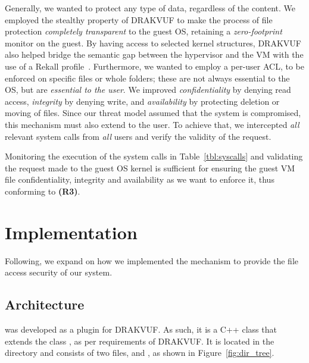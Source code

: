 \par Generally, we wanted to protect any type of data, regardless of the content. We employed the stealthy property of DRAKVUF to make the process of file protection \emph{completely transparent} to the guest \ac{OS}, retaining a \emph{zero-footprint} monitor on the guest. By having access to selected kernel structures, DRAKVUF also helped bridge the semantic gap between the hypervisor and the \ac{VM} with the use of a Rekall profile~\cite{rekall}. Furthermore, we wanted to employ a per-user \ac{ACL}, to be enforced on specific files or whole folders; these are not always essential to the \ac{OS}, but are \emph{essential to the user}. We improved \emph{confidentiality} by denying read access, \emph{integrity} by denying write, and \emph{availability} by protecting deletion or moving of files. Since our threat model assumed that the system is compromised, this mechanism must also extend to the  user. To achieve that, we intercepted \emph{all} relevant system calls from \emph{all} users and verify the validity of the request. 

\par Monitoring the execution of the system calls in Table~\ref{tbl:syscalls} and validating the request made to the guest \ac{OS} kernel is sufficient for ensuring the guest \ac{VM} file confidentiality, integrity and availability as we want to enforce it, thus conforming to \textbf{(R3)}.


\section{Implementation}\label{sec:implementation}

\par Following, we expand on how we implemented the mechanism to provide the file access security of our system.

\subsection{Architecture}\label{sub:arch}

\par {} was developed as a plugin for DRAKVUF. As such, it is a C++ class that extends the class , as per requirements of DRAKVUF. It is located in the directory  and consists of two files,  and , as shown in Figure~\ref{fig:dir_tree}. 

